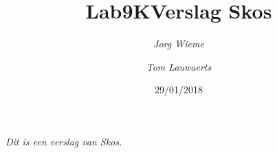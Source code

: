 \documentclass[12pt, letterpaper, oneside]{article}
\title{Lab9K\endgraf\textbf{Verslag Skos}}
\date{29/01/2018}
\author{\textit{Jorg Wieme}
	 	\and
 		\textit{Tom Lauwaerts}}
\begin{document}
\begin{titlepage}
\maketitle
\thispagestyle{empty}
\end{titlepage}

\begin{adjustwidth}{6.0em}{6.0em}
\centering \textit{Dit is een verslag van Skos.}
\end{adjustwidth}
\newpage

\tableofcontents
\end{document}
